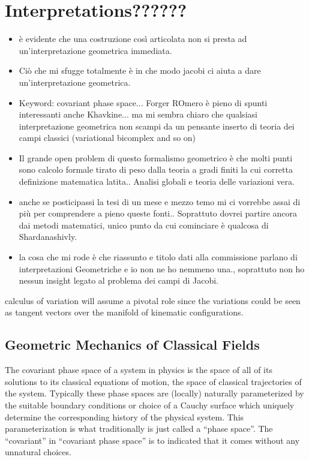 \documentclass[Main]{subfiles}
\begin{document}
\section{Interpretations??????}
\ifToninus
	\begin{Warning}
		\begin{itemize}
			\item 		è evidente che una costruzione così articolata non si presta ad un'interpretazione geometrica immediata.
			\item 		Ciò che mi sfugge totalmente è in che modo jacobi ci aiuta a dare  un'interpretazione geometrica.
			\item		Keyword: covariant phase space...  Forger ROmero è pieno di spunti interessanti anche Khavkine... ma mi sembra chiaro che qualsiasi interpretazione geometrica non scampi da un pensante inserto di teoria dei campi classici (variational bicomplex and so on)
			\item		Il grande open problem di questo formalismo geometrico è che molti punti sono calcolo formale tirato di peso dalla teoria a gradi finiti la cui corretta definizione matematica latita.. Analisi globali e teoria delle variazioni vera.
			\item anche se posticipassi la tesi di un mese  e mezzo temo mi ci vorrebbe assai di più per comprendere a pieno queste fonti.. Soprattuto dovrei partire ancora dai metodi matematici, unico punto da cui cominciare è qualcosa di Shardanashivly.
			\item la cosa che mi rode è che riassunto e titolo dati alla commissione parlano di interpretazioni Geometriche e io non ne ho nemmeno una., soprattuto non ho nessun insight legato al problema dei campi di Jacobi.
			
		\end{itemize}
		
				calculus of variation will assume a pivotal role since the variations could be seen as tangent vectors over the manifold of  kinematic configurations.


	\end{Warning}
\fi

	\subsection{Geometric Mechanics of Classical Fields}
	
	The covariant phase space of a system in physics is the space of all of its solutions to its classical equations of motion, the space of classical trajectories of the system. 
 Typically these phase spaces are (locally) naturally parameterized by the suitable boundary conditions or choice of a Cauchy surface which uniquely determine the corresponding history of the physical system. This parameterization is what traditionally is just called a “phase space”. 
	The “covariant” in “covariant phase space” is to indicated that it comes without any unnatural choices.
	
\end{document}
